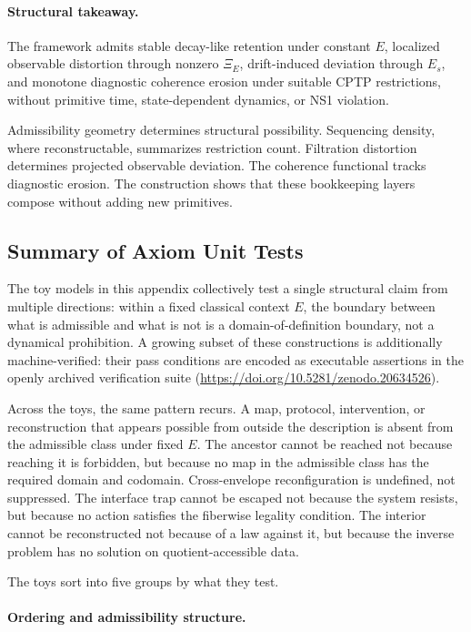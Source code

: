 \documentclass[aps,prx,onecolumn,11pt]{revtex4-2}
\theoremstyle{plain}
\theoremstyle{definition}
\theoremstyle{remark}
\begin{document}
\paragraph{Structural takeaway.}

The framework admits stable decay-like retention under constant \(E\),
localized observable distortion through nonzero \(\Xi_E\),
drift-induced deviation through \(E_s\), and monotone diagnostic
coherence erosion under suitable CPTP restrictions, without primitive
time, state-dependent dynamics, or NS1 violation.

Admissibility geometry determines structural possibility. Sequencing
density, where reconstructable, summarizes restriction count.
Filtration distortion determines projected observable deviation. The
coherence functional tracks diagnostic erosion. The construction shows
that these bookkeeping layers compose without adding new primitives.

\subsection{Summary of Axiom Unit Tests}
\label{toy:summary}

The toy models in this appendix collectively test a single structural
claim from multiple directions: within a fixed classical context \(E\),
the boundary between what is admissible and what is not is a
domain-of-definition boundary, not a dynamical prohibition. A growing
subset of these constructions is additionally machine-verified: their
pass conditions are encoded as executable assertions in the openly
archived verification suite
(\url{https://doi.org/10.5281/zenodo.20634526}).

Across the toys, the same pattern recurs. A map, protocol,
intervention, or reconstruction that appears possible from outside the
description is absent from the admissible class under fixed \(E\). The
ancestor cannot be reached not because reaching it is forbidden, but
because no map in the admissible class has the required domain and
codomain. Cross-envelope reconfiguration is undefined, not suppressed.
The interface trap cannot be escaped not because the system resists,
but because no action satisfies the fiberwise legality condition. The
interior cannot be reconstructed not because of a law against it, but
because the inverse problem has no solution on quotient-accessible data.

The toys sort into five groups by what they test.

\paragraph{Ordering and admissibility structure.}
\end{document}
